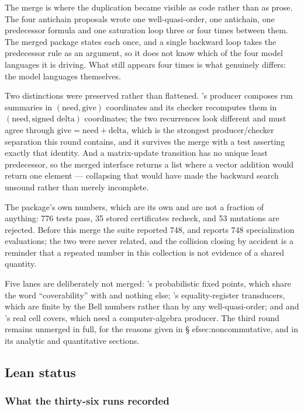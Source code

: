 The merge is where the duplication became visible as code rather than as prose.
The four antichain proposals wrote one well-quasi-order, one antichain, one
predecessor formula and one saturation loop three or four times between them.
The merged package states each once, and a single backward loop takes the
predecessor rule as an argument, so it does not know which of the four model
languages it is driving. What still appears four times is what genuinely
differs: the model languages themselves.

Two distinctions were preserved rather than flattened. 's producer
composes run summaries in $(\text{need},\text{give})$ coordinates and its
checker recomputes them in $(\text{need},\text{signed delta})$ coordinates;
the two recurrences look different and must agree through
$\text{give}=\text{need}+\text{delta}$, which is the strongest
producer/checker separation this round contains, and it survives the merge with
a test asserting exactly that identity. And a matrix-update transition has no
unique least predecessor, so the merged interface returns a list where a vector
addition would return one element --- collapsing that would have made the
backward search unsound rather than merely incomplete.

The package's own numbers, which are its own and are not a fraction of anything:
776 tests pass, 35 stored certificates recheck, and 53 mutations are rejected.
Before this merge the suite reported 748, and  reports 748
specialization evaluations; the two were never related, and the collision
closing by accident is a reminder that a repeated number in this collection is
not evidence of a shared quantity.

Five lanes are deliberately not merged: 's probabilistic fixed points,
which share the word ``coverability'' with  and nothing else;
's equality-register transducers, which are finite by the Bell numbers
rather than by any well-quasi-order; and  and 's real cell
covers, which need a computer-algebra producer. The third round remains
unmerged in full, for the reasons given in \S
ef{sec:noncommutative}, and in
its analytic and quantitative sections.

\subsection{Lean status}

\subsubsection*{What the thirty-six runs recorded}

